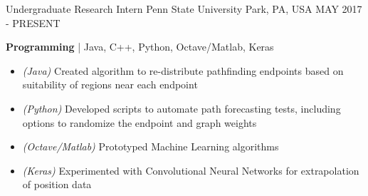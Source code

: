 \begin{cventries}
	\cventry
	{Undergraduate Research Intern} %
	{Penn State} %
	{University Park, PA, USA} %
	{MAY 2017 - PRESENT} %
	{
		\begin{cvitems} %
			\item {\textbf{Programming} | {\color{awesome}Java, C++, Python, Octave/Matlab, Keras}
				\begin{itemize}[noitemsep,wide=0pt, leftmargin=\dimexpr{} + 2\relax]
					\item[\textbullet]{\textit{(Java)} Created algorithm to re-distribute pathfinding endpoints based on suitability of regions near each endpoint}
					\item[\textbullet]{\textit{(Python)} Developed scripts to automate path forecasting tests, including options to randomize the endpoint and graph weights}
					\item[\textbullet]{\textit{(Octave/Matlab)} Prototyped Machine Learning algorithms}
					\item[\textbullet]{\textit{(Keras)} Experimented with Convolutional Neural Networks for extrapolation of position data}
				\end{itemize}}
		\end{cvitems}
	}


\end{cventries}
